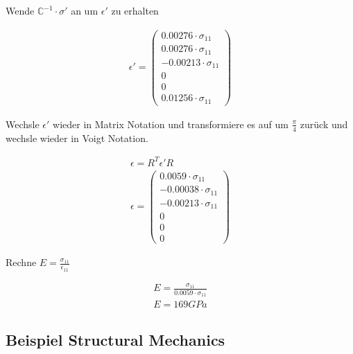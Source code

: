 \documentclass[a4paper, 10pt]{scrartcl}
\begin{document}
Wende $\mathbb{C}^{-1} \cdot \sigma'$ an um $\epsilon'$ zu erhalten

\begin{align}
	\epsilon'=\begin{pmatrix}
		0.00276 \cdot \sigma_{11} \\
		0.00276 \cdot \sigma_{11} \\
		-0.00213 \cdot \sigma_{11} \\
		0 \\
		0 \\
		0.01256 \cdot \sigma_{11}
	\end{pmatrix}
\end{align}

Wechsle $\epsilon'$ wieder in Matrix Notation und transformiere es auf um
$\frac{\pi}{4}$ zurück und wechsle wieder in Voigt Notation.

\begin{align}
	\epsilon=R^{T}\epsilon'R \\
	\epsilon=\begin{pmatrix}
		0.0059 \cdot \sigma_{11} \\
		-0.00038 \cdot \sigma_{11} \\
		-0.00213 \cdot \sigma_{11} \\
		0 \\
		0 \\
		0
	\end{pmatrix}
\end{align}

Rechne $E=\frac{\sigma_{11}}{\epsilon_{11}}$

\begin{align}
	E=\frac{\sigma_{11}}{0.0059 \cdot \sigma_{11}} \\
	E=169GPa
\end{align}

\subsection{Beispiel Structural Mechanics} %
\end{document}
